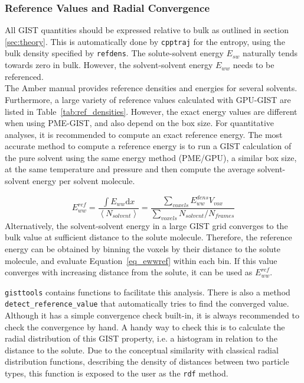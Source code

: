 \documentclass[9pt,tutorial]{livecoms}
\newcommand{\software}{\texttt}
\newcommand\inlinecode{\texttt}
\begin{document}
\subsubsection{Reference Values and Radial Convergence}
All GIST quantities should be expressed relative to bulk as outlined in section \ref{sec:theory}.
This is automatically done by \software{cpptraj} for the entropy, using the bulk density specified by \inlinecode{refdens}.
The solute-solvent energy $E_{sw}$ naturally tends towards zero in bulk.
However, the solvent-solvent energy $E_{ww}$ needs to be referenced.\\
The Amber manual provides reference densities and energies for several solvents.
Furthermore, a large variety of reference values calculated with GPU-GIST are listed in Table~\ref{tab:ref_densities}. 
However, the exact energy values are different when using PME-GIST, and also depend on the box size.
For quantitative analyses, it is recommended to compute an exact reference energy.
The most accurate method to compute a reference energy is to run a GIST calculation of the pure solvent using the same energy method (PME/GPU), a similar box size, at the same temperature and pressure and then compute the average solvent-solvent energy per solvent molecule.

\begin{equation}
\label{eq_ewwref}
E_{ww}^\textit{ref} = \frac{\int{E_{ww}} \mathrm{d}x}{\left<N_\textit{solvent}\right>}
  = \frac{\sum_\textit{voxels}E_{ww}^\textit{dens} V_\textit{vox}}{\sum_\textit{voxels}{N_\textit{solvent}} / N_\textit{frames}}
\end{equation}
Alternatively, the solvent-solvent energy in a large GIST grid converges to the bulk value at sufficient distance to the solute molecule. 
Therefore, the reference energy can be obtained by binning the voxels by their distance to the solute molecule, and evaluate Equation~\ref{eq_ewwref} within each bin.
If this value converges with increasing distance from the solute, it can be used as $E_{ww}^\textit{ref}$.

\software{gisttools} contains functions to facilitate this analysis.
There is also a method \inlinecode{detect\_reference\_value} that automatically tries to find the converged value.
Although it has a simple convergence check built-in, it is always recommended to check the convergence by hand. A handy way to check this is to calculate the radial distribution of this GIST property, i.e. a histogram in relation to the distance to the solute. Due to the conceptual similarity with classical radial distribution functions, describing the density of distances between two particle types, this function is exposed to the user as the \inlinecode{rdf} method.
\end{document}
